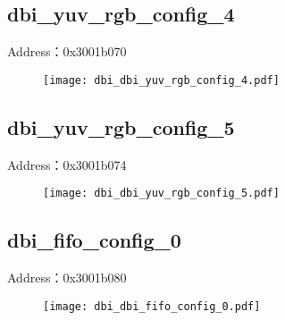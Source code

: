 \subsection{dbi\_yuv\_rgb\_config\_4}
\label{dbi-dbi-yuv-rgb-config-4}
Address：0x3001b070
 \begin{figure}[H]
\texttt{[image: dbi\_dbi\_yuv\_rgb\_config\_4.pdf]}
\end{figure}

\subsection{dbi\_yuv\_rgb\_config\_5}
\label{dbi-dbi-yuv-rgb-config-5}
Address：0x3001b074
 \begin{figure}[H]
\texttt{[image: dbi\_dbi\_yuv\_rgb\_config\_5.pdf]}
\end{figure}

\subsection{dbi\_fifo\_config\_0}
\label{dbi-dbi-fifo-config-0}
Address：0x3001b080
 \begin{figure}[H]
\texttt{[image: dbi\_dbi\_fifo\_config\_0.pdf]}
\end{figure}

